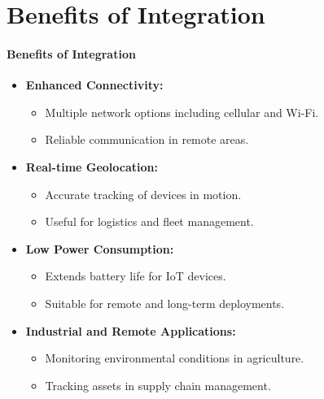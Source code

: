 \section{Benefits of Integration}
{ 
	\framesubtitle{Benefits of Integration}
\begin{itemize}
	\item \textbf{Enhanced Connectivity:}
	\begin{itemize}
		\item Multiple network options including cellular and Wi-Fi.
		\item Reliable communication in remote areas.
	\end{itemize}
	\item \textbf{Real-time Geolocation:}
	\begin{itemize}
		\item Accurate tracking of devices in motion.
		\item Useful for logistics and fleet management.
	\end{itemize}
	\item \textbf{Low Power Consumption:}
	\begin{itemize}
		\item Extends battery life for IoT devices.
		\item Suitable for remote and long-term deployments.
	\end{itemize}
	\item \textbf{Industrial and Remote Applications:}
	\begin{itemize}
		\item Monitoring environmental conditions in agriculture.
		\item Tracking assets in supply chain management.
	\end{itemize}
\end{itemize}
}

